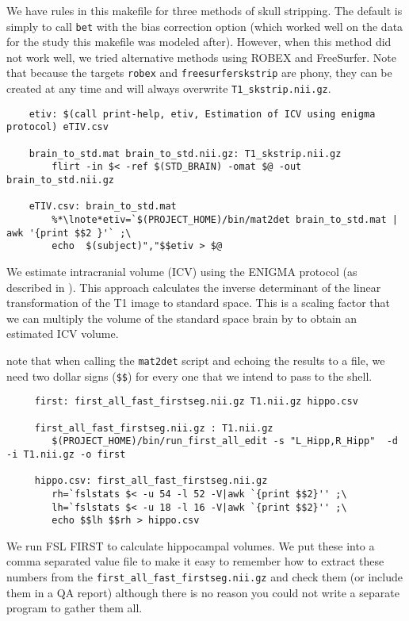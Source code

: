 We have rules in this makefile for three methods of skull
stripping. The default is simply to call \texttt{bet} with the bias
correction option (which worked well on the data for the study this
makefile was modeled after). However, when this method did not work
well, we tried alternative methods using ROBEX and FreeSurfer. Note
that because the targets \texttt{robex} and \texttt{freesurferskstrip}
are phony, they can be created at any time and will always overwrite
\texttt{T1_skstrip.nii.gz}. 


\begin{lstlisting}
	etiv: $(call print-help, etiv, Estimation of ICV using enigma protocol) eTIV.csv

	brain_to_std.mat brain_to_std.nii.gz: T1_skstrip.nii.gz 
		flirt -in $< -ref $(STD_BRAIN) -omat $@ -out brain_to_std.nii.gz

	eTIV.csv: brain_to_std.mat
		%*\lnote*etiv=`$(PROJECT_HOME)/bin/mat2det brain_to_std.mat | awk '{print $$2 }'` ;\
		echo  $(subject)","$$etiv > $@
\end{lstlisting}

We estimate intracranial volume (ICV) using the ENIGMA protocol (as described in
). This approach calculates the inverse 
determinant of the linear transformation of the T1 image to standard
space. This is a scaling factor that we can multiply the volume of the
standard space brain by to obtain an estimated ICV volume. 

 note that when calling the \texttt{mat2det} script and
echoing the results to a file, we need two dollar signs (\texttt{\$\$})
for every one that we intend to pass to the shell.  



\begin{lstlisting}
	 first: first_all_fast_firstseg.nii.gz T1.nii.gz hippo.csv

	 first_all_fast_firstseg.nii.gz : T1.nii.gz
		$(PROJECT_HOME)/bin/run_first_all_edit -s "L_Hipp,R_Hipp"  -d -i T1.nii.gz -o first

	 hippo.csv: first_all_fast_firstseg.nii.gz 
		rh=`fslstats $< -u 54 -l 52 -V|awk `{print $$2}'' ;\
		lh=`fslstats $< -u 18 -l 16 -V|awk `{print $$2}'' ;\
		echo $$lh $$rh > hippo.csv
\end{lstlisting}

We run FSL FIRST to calculate hippocampal volumes. We put these into a
comma separated value file to make it easy to remember how to extract
these numbers from the \texttt{first_all_fast_firstseg.nii.gz} and
check them (or include them in a QA report) although there is no
reason you could not write a separate program to gather them all.


